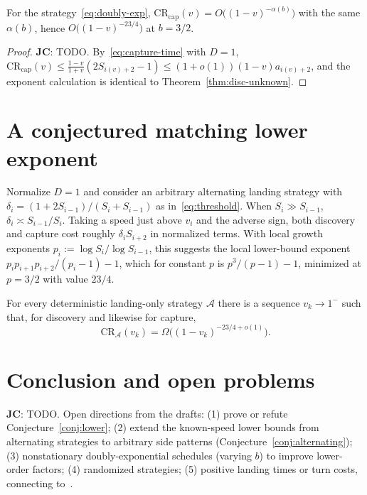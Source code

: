 \documentclass[runningheads,envcountsame,envcountsect]{llncs}
\newcommand\JC[1]{{\color{Maroon} \textbf{JC}: #1}}
\newcommand{\CR}{\mathrm{CR}}
\newcommand{\capt}{\mathrm{cap}}
\begin{document}
\begin{theorem}\label{thm:cap-unknown}
For the strategy~\eqref{eq:doubly-exp}, $\CR_{\capt}(v) = O\big((1 - v)^{-\alpha(b)}\big)$ with the same $\alpha(b)$, hence $O\big((1-v)^{-23/4}\big)$ at $b = 3/2$.
\end{theorem}
\begin{proof}
\JC{TODO. By~\eqref{eq:capture-time} with $D = 1$, $\CR_{\capt}(v) \leq \frac{1-v}{1+v}(2 S_{i(v)+2} - 1) \leq (1 + o(1)) (1-v) a_{i(v)+2}$, and the exponent calculation is identical to Theorem~\ref{thm:disc-unknown}.}
\end{proof}

\FloatBarrier
\section{A conjectured matching lower exponent}\label{sec:lower-conj}

Normalize $D = 1$ and consider an arbitrary alternating landing strategy with $\delta_i = (1 + 2 S_{i-1})/(S_i + S_{i-1})$ as in~\eqref{eq:threshold}. When $S_i \gg S_{i-1}$, $\delta_i \asymp S_{i-1}/S_i$. Taking a speed just above $v_i$ and the adverse sign, both discovery and capture cost roughly $\delta_i S_{i+2}$ in normalized terms. With local growth exponents $p_i := \log S_i / \log S_{i-1}$, this suggests the local lower-bound exponent $p_i p_{i+1} p_{i+2}/(p_i - 1) - 1$, which for constant $p$ is $p^3/(p-1) - 1$, minimized at $p = 3/2$ with value $23/4$.

\begin{conjecture}\label{conj:lower}
For every deterministic landing-only strategy $\mathcal{A}$ there is a sequence $v_k \to 1^-$ such that, for discovery and likewise for capture,
\[
  \CR_{\mathcal{A}}(v_k) = \Omega\big( (1 - v_k)^{-23/4 + o(1)} \big) .
\]
\end{conjecture}

\FloatBarrier
\section{Conclusion and open problems}\label{sec:conclusion}

\JC{TODO. Open directions from the drafts: (1) prove or refute Conjecture~\ref{conj:lower}; (2) extend the known-speed lower bounds from alternating strategies to arbitrary side patterns (Conjecture~\ref{conj:alternating}); (3) nonstationary doubly-exponential schedules (varying $b$) to improve lower-order factors; (4) randomized strategies; (5) positive landing times or turn costs, connecting to~\cite{demaine2006online}.}



\end{document}

